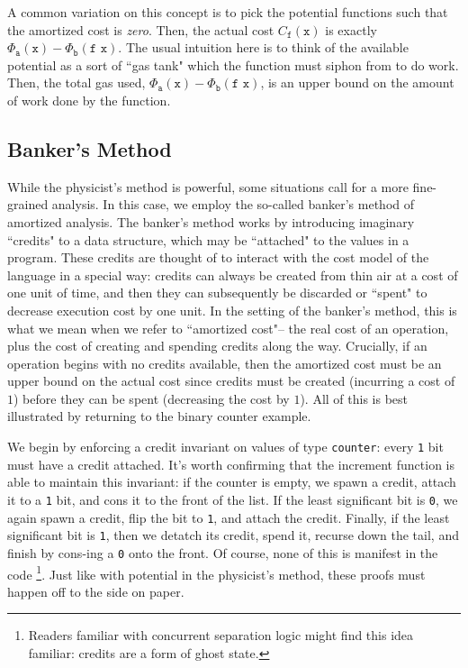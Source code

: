 A common variation on this concept is to pick the potential functions such that the amortized cost is \textit{zero}. Then, the actual cost $C_\texttt{f}(\texttt{x})$ is exactly $\Phi_\texttt{a}(\texttt{x}) - \Phi_\texttt{b}(\texttt{f x})$. The usual intuition here is to think of the available potential as a sort of ``gas tank" which the function must siphon from to do work. Then, the total gas used, $\Phi_\texttt{a}(\texttt{x}) - \Phi_\texttt{b}(\texttt{f x})$, is an upper bound on the amount of work done by the function.


\subsection{Banker's Method}
While the physicist's method is powerful, some situations call for a more fine-grained analysis. In this case, we employ the so-called banker's method of amortized analysis. The banker's method works by introducing imaginary ``credits" to a data structure, which may be ``attached" to the values in a program. These credits are thought of to interact with the cost model of the language in a special way: credits can always be created from thin air at a cost of one unit of time, and then they can subsequently be discarded or ``spent" to decrease execution cost by one unit. In the setting of the banker's method, this is what we mean when we refer to ``amortized cost"-- the real cost of an operation, plus the cost of creating and spending credits along the way. Crucially, if an operation begins with no credits available, then the amortized cost must be an upper bound on the actual cost since credits must be created (incurring a cost of $1$) before they can be spent (decreasing the cost by $1$). All of this is best illustrated by returning to the binary counter example.

We begin by enforcing a credit invariant on values of type \texttt{counter}: every \texttt{1} bit must have a credit attached. It's worth confirming that the increment function is able to maintain this invariant: if the counter is empty, we spawn a credit, attach it to a \texttt{1} bit, and cons it to the front of the list.
If the least significant bit is \texttt{0}, we again spawn a credit, flip the bit to \texttt{1}, and attach the credit. Finally, if the least significant bit is \texttt{1}, then we detatch its credit, spend it, recurse down the tail, and finish by cons-ing a \texttt{0} onto the front. Of course, none of this is manifest in the code
\footnote{
Readers familiar with concurrent separation logic might find this idea familiar: credits are a form of ghost state.
}.
Just like with potential in the physicist's method, these proofs must happen off to the side on paper.

